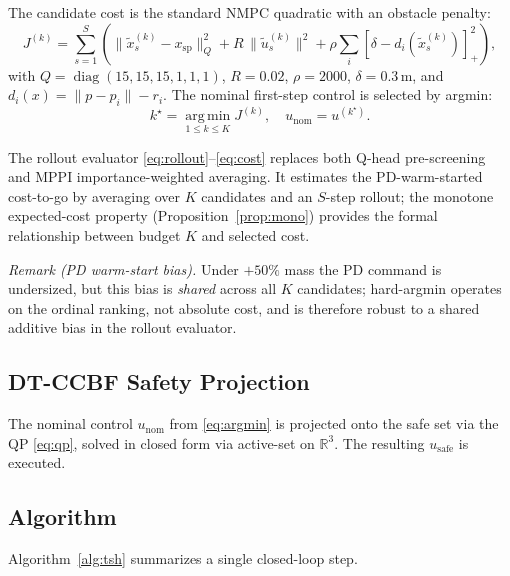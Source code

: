 \documentclass[11pt,onecolumn,a4paper]{article}
\newcommand{\R}{\mathbb{R}}
\newcommand{\spt}{\mathrm{sp}}
\newcommand{\nom}{\mathrm{nom}}
\newcommand{\safe}{\mathrm{safe}}
\begin{document}
The candidate cost is the standard NMPC quadratic with an obstacle
penalty:
\begin{equation}\label{eq:cost}
J^{(k)} = \sum_{s=1}^{S}\!\!\left(\!\|\tilde{x}_s^{(k)} - x_\spt\|_Q^2
+ R\,\|\tilde{u}_s^{(k)}\|^2
+ \rho \sum_i [\delta - d_i(\tilde{x}_s^{(k)})]_+^2\!\right),
\end{equation}
with $Q = \operatorname{diag}(15,15,15,1,1,1)$, $R = 0.02$,
$\rho = 2000$, $\delta = 0.3\,\mathrm{m}$, and $d_i(x) = \|p - p_i\| -
r_i$. The nominal first-step control is selected by argmin:
\begin{equation}\label{eq:argmin}
k^\star = \operatorname*{arg\,min}_{1 \le k \le K} J^{(k)},
\quad u_\nom = u^{(k^\star)}.
\end{equation}

The rollout evaluator \eqref{eq:rollout}--\eqref{eq:cost} replaces
both Q-head pre-screening and MPPI importance-weighted averaging. It
estimates the PD-warm-started cost-to-go by averaging over $K$
candidates and an $S$-step rollout; the monotone expected-cost
property (Proposition~\ref{prop:mono}) provides the formal
relationship between budget $K$ and selected cost.

\emph{Remark (PD warm-start bias).}
Under $+50\%$ mass the PD command is undersized, but this bias is
\emph{shared} across all $K$ candidates; hard-argmin operates on the
ordinal ranking, not absolute cost, and is therefore robust to a
shared additive bias in the rollout evaluator.

\subsection{DT-CCBF Safety Projection}

The nominal control $u_\nom$ from \eqref{eq:argmin} is projected onto
the safe set via the QP \eqref{eq:qp}, solved in closed form via
active-set on $\R^3$. The resulting $u_\safe$ is executed.

\subsection{Algorithm}

Algorithm~\ref{alg:tsh} summarizes a single closed-loop step.
\end{document}
